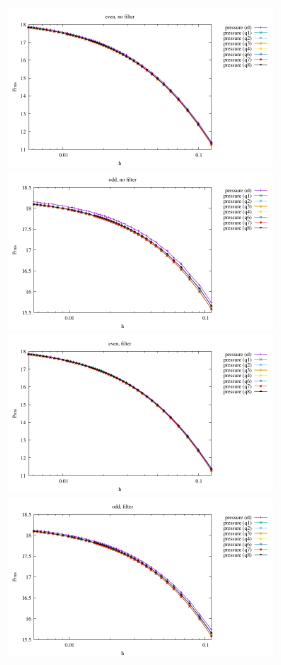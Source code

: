 \begin{center}
\includegraphics[width=7cm]{python_codes/fieldstone_12/results/punch/prms_even_nofilter}
\includegraphics[width=7cm]{python_codes/fieldstone_12/results/punch/prms_odd_nofilter}\\
\includegraphics[width=7cm]{python_codes/fieldstone_12/results/punch/prms_even_filter}
\includegraphics[width=7cm]{python_codes/fieldstone_12/results/punch/prms_odd_filter}\\
\end{center}

